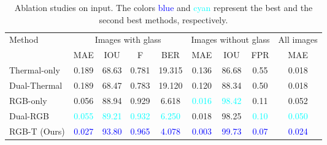 \begin{table*}[ht]
\renewcommand\arraystretch{1.5}
\setlength\tabcolsep{5pt}
\centering
\caption{Ablation studies on input. The colors \textcolor{blue}{blue} and \textcolor{cyan}{cyan} represent the best and the second best methods, respectively.}
\label{tab:ab_input}             
\begin{tabular}{lcccccccc} 
\toprule
\multirow{2}{*}{Method} & \multicolumn{4}{c}{Images with glass} & \multicolumn{3}{c}{Images without glass} & All images        \\ 
\cmidrule[0.25pt](lr){2-5} \cmidrule[0.25pt](lr){6-8} \cmidrule[0.25pt](lr){9-9} 
& MAE                       & IOU                         & F                     & BER                       & MAE                       & IOU                    & FPR                      & MAE   \\ 
\midrule
     
Thermal-only & 0.189 & 68.63 & 0.781 & 19.315 & 0.136 & 86.68 & 0.55 & 0.018\\ 
Dual-Thermal & 0.189 & 68.47 & 0.783 & 19.120 & 0.120 & 88.34 & 0.50 & 0.018\\ 
RGB-only & \multicolumn{1}{c}{0.056} & \multicolumn{1}{c}{88.94} & \multicolumn{1}{c}{0.929} & 6.618 & \multicolumn{1}{c}{\textcolor{cyan}{0.016}} & \multicolumn{1}{c}{\textcolor{cyan}{98.42}} & 0.11 & 0.052\\ 
Dual-RGB & \multicolumn{1}{c}{\textcolor{cyan}{0.055}} & \multicolumn{1}{c}{\textcolor{cyan}{89.21}} & \multicolumn{1}{c}{\textcolor{cyan}{0.932}} & \textcolor{cyan}{6.250} & \multicolumn{1}{c}{0.018} & \multicolumn{1}{c}{98.25} & \textcolor{cyan}{0.10} & \textcolor{cyan}{0.050}\\ \hline

RGB-T (Ours) & \multicolumn{1}{c}{\textcolor{blue}{0.027}} & \multicolumn{1}{c}{\textcolor{blue}{93.80}} & \multicolumn{1}{c}{\textcolor{blue}{0.965}} & \textcolor{blue}{4.078} & \multicolumn{1}{c}{\textcolor{blue}{0.003}} & \multicolumn{1}{c}{\textcolor{blue}{99.73}} & \textcolor{blue}{0.07} & \textcolor{blue}{0.024}\\ 
\bottomrule
\end{tabular}
\end{table*}




